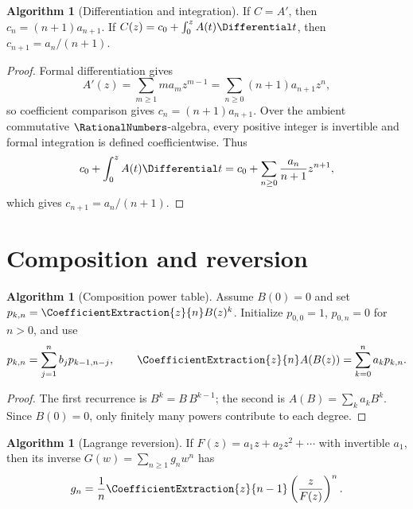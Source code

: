 \documentclass[11pt,a4paper,oneside,openany]{book}
\theoremstyle{definition}
\newtheorem{algorithm}[theorem]{Algorithm}
\theoremstyle{remark}
\begin{document}
\begin{algorithm}[Differentiation and integration]
\label{alg:merged-differentiation-integration}
If $C=A'$, then $c_n=(n+1)a_{n+1}$.  If
$C(z)=c_0+\int_0^zA(t)\Differential t$, then $c_{n+1}=a_n/(n+1)$.
\end{algorithm}

\begin{proof}
Formal differentiation gives
\[
 A'(z)=\sum_{m\ge1}ma_mz^{m-1}
      =\sum_{n\ge0}(n+1)a_{n+1}z^n,
\]
so coefficient comparison gives $c_n=(n+1)a_{n+1}$.  Over the ambient
commutative $\RationalNumbers$-algebra, every positive integer is invertible and
formal integration is defined coefficientwise.  Thus
\[
 c_0+\int_0^zA(t)\Differential t
 =c_0+\sum_{n\ge0}\frac{a_n}{n+1}z^{n+1},
\]
which gives $c_{n+1}=a_n/(n+1)$.
\end{proof}

\section{Composition and reversion}

\begin{algorithm}[Composition power table]
\label{alg:merged-composition}
Assume $B(0)=0$ and set $p_{k,n}=\CoefficientExtraction{z}{n}B(z)^k$.  Initialize
$p_{0,0}=1$, $p_{0,n}=0$ for $n>0$, and use
\begin{equation}
 p_{k,n}=\sum_{j=1}^{n}b_jp_{k-1,n-j},\qquad
 \CoefficientExtraction{z}{n}A(B(z))=\sum_{k=0}^{n}a_kp_{k,n}.                            \label{eq:merged-alg-composition}
\end{equation}
\end{algorithm}

\begin{proof}
The first recurrence is $B^k=B\,B^{k-1}$; the second is
$A(B)=\sum_ka_kB^k$.  Since $B(0)=0$, only finitely many powers contribute to
each degree.
\end{proof}

\begin{algorithm}[Lagrange reversion]
\label{alg:merged-lagrange-reversion}
If $F(z)=a_1z+a_2z^2+\cdots$ with invertible $a_1$, then its inverse
$G(w)=\sum_{n\geq1}g_nw^n$ has
\begin{equation}
 g_n=\frac1n\CoefficientExtraction{z}{n-1}\left(\frac z{F(z)}\right)^n.                 \label{eq:merged-alg-lagrange-reversion}
\end{equation}
\end{algorithm}
\end{document}
